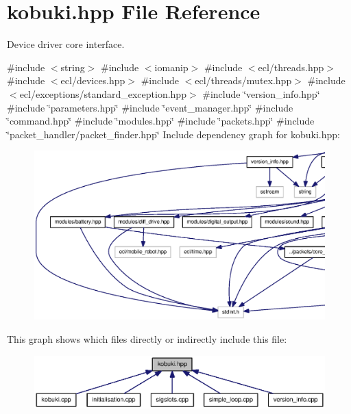 \section{kobuki.\-hpp \-File \-Reference}
\label{kobuki_8hpp}


\-Device driver core interface.  


{\ttfamily \#include $<$string$>$}\*
{\ttfamily \#include $<$iomanip$>$}\*
{\ttfamily \#include $<$ecl/threads.\-hpp$>$}\*
{\ttfamily \#include $<$ecl/devices.\-hpp$>$}\*
{\ttfamily \#include $<$ecl/threads/mutex.\-hpp$>$}\*
{\ttfamily \#include $<$ecl/exceptions/standard\-\_\-exception.\-hpp$>$}\*
{\ttfamily \#include \char`\"{}version\-\_\-info.\-hpp\char`\"{}}\*
{\ttfamily \#include \char`\"{}parameters.\-hpp\char`\"{}}\*
{\ttfamily \#include \char`\"{}event\-\_\-manager.\-hpp\char`\"{}}\*
{\ttfamily \#include \char`\"{}command.\-hpp\char`\"{}}\*
{\ttfamily \#include \char`\"{}modules.\-hpp\char`\"{}}\*
{\ttfamily \#include \char`\"{}packets.\-hpp\char`\"{}}\*
{\ttfamily \#include \char`\"{}packet\-\_\-handler/packet\-\_\-finder.\-hpp\char`\"{}}\*
\-Include dependency graph for kobuki.\-hpp\-:
\nopagebreak
\begin{figure}[H]
\begin{center}
\leavevmode
\includegraphics[width=350pt]{kobuki_8hpp__incl}
\end{center}
\end{figure}
\-This graph shows which files directly or indirectly include this file\-:
\nopagebreak
\begin{figure}[H]
\begin{center}
\leavevmode
\includegraphics[width=350pt]{kobuki_8hpp__dep__incl}
\end{center}
\end{figure}

